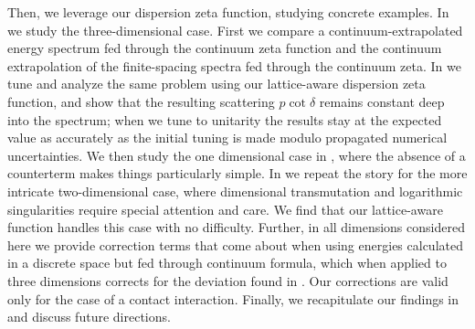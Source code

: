 Then, we leverage our dispersion zeta function, studying concrete examples.
In  we study the three-dimensional case.
First we compare a continuum-extrapolated energy spectrum fed through the continuum zeta function and the continuum extrapolation of the finite-spacing spectra fed through the continuum zeta.
In  we tune and analyze the same problem using our lattice-aware dispersion zeta function, and show that the resulting scattering $p\cot\delta$ remains constant deep into the spectrum; when we tune to unitarity the results stay at the expected value as accurately as the initial tuning is made modulo propagated numerical uncertainties.
We then study the one dimensional case in , where the absence of a counterterm makes things particularly simple.
In  we repeat the story for the more intricate two-dimensional case, where dimensional transmutation and logarithmic singularities require special attention and care.
We find that our lattice-aware \Luscher function handles this case with no difficulty.
Further, in all dimensions considered here we provide correction terms that come about when using energies calculated in a discrete space but fed through continuum \Luscher formula, which when applied to three dimensions corrects for the deviation found in .
Our corrections are valid only for the case of a contact interaction.
Finally, we recapitulate our findings in  and discuss future directions.
